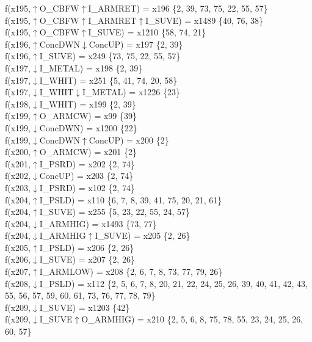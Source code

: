 f(x195,$\uparrow$O\_CBFW$\uparrow$I\_ARMRET) = x196 \{2, 39, 73, 75, 22, 55, 57\} \\  
f(x195,$\uparrow$O\_CBFW$\uparrow$I\_ARMRET$\uparrow$I\_SUVE) = x1489 \{40, 76, 38\} \\  
f(x195,$\uparrow$O\_CBFW$\uparrow$I\_SUVE) = x1210 \{58, 74, 21\} \\  
f(x196,$\uparrow$ConcDWN$\downarrow$ConcUP) = x197 \{2, 39\} \\  
f(x196,$\uparrow$I\_SUVE) = x249 \{73, 75, 22, 55, 57\} \\  
f(x197,$\downarrow$I\_METAL) = x198 \{2, 39\} \\  
f(x197,$\downarrow$I\_WHIT) = x251 \{5, 41, 74, 20, 58\} \\  
f(x197,$\downarrow$I\_WHIT$\downarrow$I\_METAL) = x1226 \{23\} \\  
f(x198,$\downarrow$I\_WHIT) = x199 \{2, 39\} \\  
f(x199,$\uparrow$O\_ARMCW) = x99 \{39\} \\  
f(x199,$\downarrow$ConcDWN) = x1200 \{22\} \\  
f(x199,$\downarrow$ConcDWN$\uparrow$ConcUP) = x200 \{2\} \\  
f(x200,$\uparrow$O\_ARMCW) = x201 \{2\} \\  
f(x201,$\uparrow$I\_PSRD) = x202 \{2, 74\} \\  
f(x202,$\downarrow$ConcUP) = x203 \{2, 74\} \\  
f(x203,$\downarrow$I\_PSRD) = x102 \{2, 74\} \\  
f(x204,$\uparrow$I\_PSLD) = x110 \{6, 7, 8, 39, 41, 75, 20, 21, 61\} \\  
f(x204,$\uparrow$I\_SUVE) = x255 \{5, 23, 22, 55, 24, 57\} \\  
f(x204,$\downarrow$I\_ARMHIG) = x1493 \{73, 77\} \\  
f(x204,$\downarrow$I\_ARMHIG$\uparrow$I\_SUVE) = x205 \{2, 26\} \\  
f(x205,$\uparrow$I\_PSLD) = x206 \{2, 26\} \\  
f(x206,$\downarrow$I\_SUVE) = x207 \{2, 26\} \\  
f(x207,$\uparrow$I\_ARMLOW) = x208 \{2, 6, 7, 8, 73, 77, 79, 26\} \\  
f(x208,$\downarrow$I\_PSLD) = x112 \{2, 5, 6, 7, 8, 20, 21, 22, 24, 25, 26, 39, 40, 41, 42, 43, 55, 56, 57, 59, 60, 61, 73, 76, 77, 78, 79\} \\  
f(x209,$\downarrow$I\_SUVE) = x1203 \{42\} \\  
f(x209,$\downarrow$I\_SUVE$\uparrow$O\_ARMHIG) = x210 \{2, 5, 6, 8, 75, 78, 55, 23, 24, 25, 26, 60, 57\} \\  
